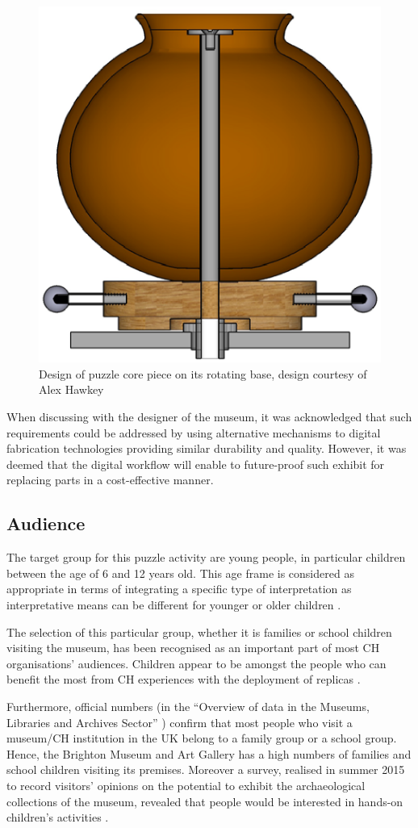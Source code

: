 \documentclass[acmlarge,screen]{acmart}
\begin{document}
\begin{figure}[h]
  \centering
  \includegraphics[width=0.6\linewidth]{images/alexdesign}
  \caption{\label{fig:alexdesign}
    Design of puzzle core piece on its rotating base, design courtesy of Alex Hawkey}
\end{figure}

When discussing with the designer of the museum, it was acknowledged that such requirements could be addressed by using alternative mechanisms to digital fabrication technologies providing similar durability and quality. However, it was deemed that the digital workflow will enable to future-proof such exhibit for replacing parts in a cost-effective manner.

\subsection{Audience}
The target group for this puzzle activity are young people, in particular children between the age of 6 and 12 years old. This age frame is considered as appropriate in terms of integrating a specific type of interpretation as interpretative means can be different for younger or older children \cite{Tilden1977}. 

The selection of this particular group, whether it is families or school children visiting the museum, has been recognised as an important part of most CH organisations' audiences. Children appear to be amongst the people who can benefit the most from CH experiences with the deployment of replicas \cite{Cabral2013,Neely2015,Miles2015}.

Furthermore, official numbers (in the ``Overview of data in the Museums, Libraries and Archives Sector'' \cite{Matty2004}) confirm that most people who visit a museum/CH institution in the UK belong to a family group or a school group. Hence, the Brighton Museum and Art Gallery has a high numbers of families and school children visiting its premises. Moreover a survey, realised in summer 2015 to record visitors' opinions on the potential to exhibit the archaeological collections of the museum, revealed that people would be interested in hands-on children's activities \cite{RoyalPavilionandMuseums2015}.
\end{document}
